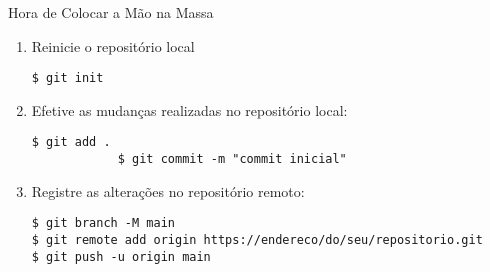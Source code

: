 
\begin{frame}{Hora de Colocar a Mão na Massa}
	\begin{enumerate}
        \item Reinicie o repositório local 
		\begin{lstlisting}[style=BashInputBasicStyle]
			$ git init
		\end{lstlisting}

        \item Efetive as mudanças realizadas no repositório local:  		
        \begin{lstlisting}[style=BashInputBasicStyle]
			$ git add .
			$ git commit -m "commit inicial"
		\end{lstlisting}

		\item Registre as alterações no repositório remoto:
        \begin{lstlisting}[style=BashInputBasicStyle]
$ git branch -M main
$ git remote add origin https://endereco/do/seu/repositorio.git
$ git push -u origin main
		\end{lstlisting}
	\end{enumerate}
\end{frame}
